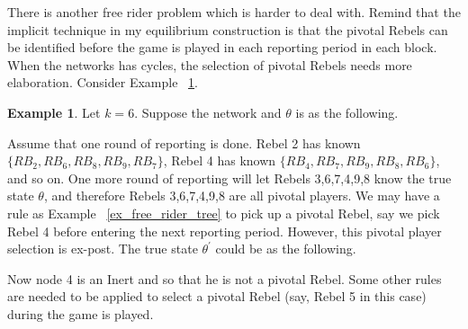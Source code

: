 \documentclass[12pt,letter]{article}
\theoremstyle{definition}
\newtheorem{example}{Example}[section]
\theoremstyle{remark}
\theoremstyle{claim}
\begin{document}
There is another free rider problem which is harder to deal with. Remind that the implicit technique in my equilibrium construction is that the pivotal Rebels can be identified before the game is played in each reporting period in each block. When the networks has cycles, the selection of pivotal Rebels needs more elaboration. Consider Example ~\ref{ex_free_rider_cycle}.
\begin{example}\label{ex_free_rider_cycle}
Let $k=6$. Suppose the network and $\theta$ is as the following. 

\begin{center}
\end{center}

Assume that one round of reporting is done. Rebel 2 has known $\{RB_2,RB_6,RB_8,RB_9,RB_7\}$, Rebel 4 has known $\{RB_4,RB_7,RB_9,RB_8,RB_6\}$, and so on. One more round of reporting will let Rebels 3,6,7,4,9,8 know the true state $\theta$, and therefore Rebels 3,6,7,4,9,8 are all pivotal players. We may have a rule as Example ~\ref{ex_free_rider_tree} to pick up a pivotal Rebel, say we pick Rebel 4 before entering the next reporting period. However, this pivotal player selection is ex-post. The true state $\theta^{'}$ could be as the following.

\begin{center}
\end{center}

Now node 4 is an Inert and so that he is not a pivotal Rebel. Some other rules are needed to be applied to select a pivotal Rebel (say, Rebel 5 in this case) during the game is played. 

\end{example}
\end{document}
